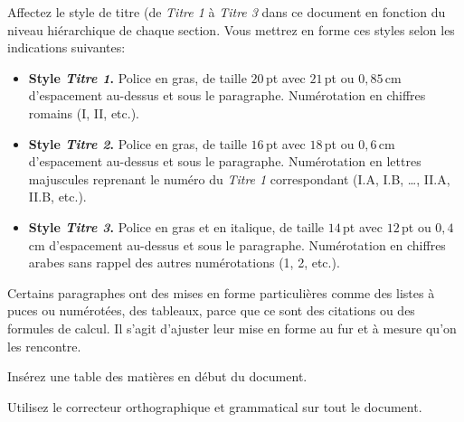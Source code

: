 \documentclass[a4paper, 9pt]{article}
\begin{document}
\exost Affectez le style de titre (de \emph{Titre 1} \`a \emph{Titre 3} dans ce document en fonction du niveau hi\'erarchique
de chaque section. Vous mettrez en forme ces styles selon les indications suivantes:
    \begin{itemize}
      \item \textbf{Style \emph{Titre 1}.} Police en gras, de taille $20$\,pt avec $21$\,pt ou $0,85$\,cm d'espacement au-dessus et sous le paragraphe. Num\'erotation en chiffres romains (I, II, etc.).
      \item \textbf{Style \emph{Titre 2}.} Police en gras, de taille $16$\,pt avec $18$\,pt ou $0,6$\,cm d'espacement au-dessus et sous le paragraphe. Num\'erotation en lettres majuscules reprenant le num\'ero du \emph{Titre 1} correspondant (I.A, I.B, \dots, II.A, II.B, etc.).
      \item \textbf{Style \emph{Titre 3}.} Police en gras et en italique, de taille $14$\,pt avec $12$\,pt ou $0,4$\,cm d'espacement au-dessus et sous le paragraphe. Num\'erotation en chiffres arabes sans rappel des autres num\'erotations (1, 2, etc.).
    \end{itemize}

\exost
  Certains paragraphes ont des mises en forme particuli\`eres comme des listes \`a puces 
 ou num\'erot\'ees, des tableaux, parce que ce sont des citations ou des formules de calcul.
 Il s'agit d'ajuster leur mise en forme  au fur et \`a mesure qu'on les rencontre.

\exost Ins\'erez une table des mati\`eres en d\'ebut du document. %



\exost Utilisez le correcteur orthographique et grammatical sur tout le document.
\end{document}

